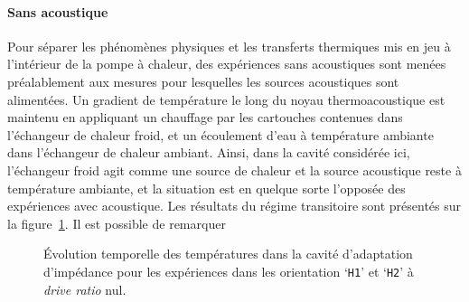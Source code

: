 \paragraph*{Sans acoustique}
Pour séparer les phénomènes physiques et les transferts thermiques mis en jeu à l'intérieur de la pompe à chaleur, des expériences sans acoustiques sont menées préalablement aux mesures pour lesquelles les sources acoustiques sont alimentées. Un gradient de température le long du noyau thermoacoustique est maintenu en appliquant un chauffage par les cartouches contenues dans l'échangeur de chaleur froid, et un écoulement d'eau à température ambiante dans l'échangeur de chaleur ambiant. Ainsi, dans la cavité considérée ici, l'échangeur froid agit comme une source de chaleur et la source acoustique reste à température ambiante, et la situation est en quelque sorte l'opposée des expériences avec acoustique. Les résultats du régime transitoire sont présentés sur la figure~\ref{fig:HeatOnly_CHXout_H1H2}. Il est possible de remarquer

\begin{figure}[!ht]
    \centering
    
    \caption{\'Evolution temporelle des températures dans la cavité d'adaptation d'impédance pour les expériences dans les orientation `\texttt{H1}' et `\texttt{H2}' à \textit{drive ratio} nul.}
    \label{fig:HeatOnly_CHXout_H1H2}
\end{figure}

